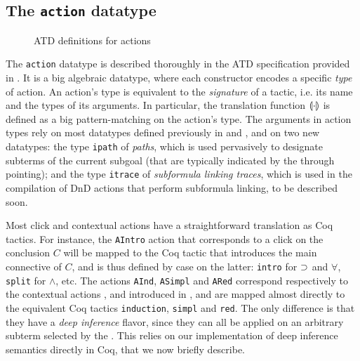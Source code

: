 \subsection{The \texttt{action} datatype}

\begin{figure}
  
  \caption{ATD definitions for actions}
\end{figure}

The \texttt{action} datatype is described thoroughly in the ATD specification
provided in . It is a big algebraic datatype, where each
constructor encodes a specific \emph{type} of action. An action's type is
equivalent to the \emph{signature} of a tactic, i.e. its name and the types of
its arguments. In particular, the translation function $\llparenthesis \cdot \rrparenthesis$ is
defined as a big pattern-matching on the action's type. The arguments in action types rely
on most datatypes defined previously in  and ,
and on two new datatypes: the type \texttt{ipath} of \emph{paths}, which is used
pervasively to designate subterms of the current subgoal (that are typically
indicated by the  through pointing); and the type \texttt{itrace}
of \emph{subformula linking traces}, which is used in the compilation of DnD
actions that perform subformula linking, to be described soon.

Most click and contextual actions have a straightforward translation as Coq
tactics. For instance, the \texttt{AIntro} action that corresponds to a click on
the conclusion $C$ will be mapped to the Coq tactic that introduces the main
connective of $C$, and is thus defined by case on the latter: \texttt{intro} for
$\supset$ and $\forall$, \texttt{split} for $\land$, etc. The actions
\texttt{AInd}, \texttt{ASimpl} and \texttt{ARed} correspond respectively to the
contextual actions ,  and 
introduced in , and are mapped almost directly to the equivalent
Coq tactics \texttt{induction}, \texttt{simpl} and \texttt{red}. The only
difference is that they have a \emph{deep inference} flavor, since they can all
be applied on an arbitrary subterm selected by the . This relies
on our implementation of deep inference semantics directly in Coq, that we now
briefly describe.

